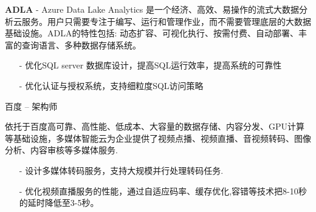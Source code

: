 \documentclass[10pt,a4paper]{moderncv}
\begin{document}
\vspace{1ex}
{
    \textbf{ADLA} - Azure Data Lake Analytics 是一个经济、高效、易操作的流式大数据分析云服务。用户只需要专注于编写、运行和管理作业，而不需要管理底层的大数据基础设施。ADLA的特性包括: 动态扩容、可视化执行、按需付费、自动部署、丰富的查询语言、多种数据存储系统。
    \begin{itemize}
		\item[-] 优化SQL server 数据库设计，提高SQL运行效率，提高系统的可靠性
		\item[-] 优化认证与授权系统，支持细粒度SQL访问策略
	\end{itemize}
}
\vspace{2ex}

\pagebreak
	{ 百度 -- 架构师}{}{}{}{}
	\vspace{1ex}

{
	 依托于百度高可靠、高性能、低成本、大容量的数据存储、内容分发、GPU计算等基础设施，多媒体智能云为企业提供了视频点播、视频直播、音视频转码、图像分析、内容审核等多媒体服务.
	 \begin{itemize}
		\item[-] 设计多媒体转码服务，支持大规模并行处理转码任务.
		\item[-] 优化视频直播服务的性能，通过自适应码率、缓存优化,容错等技术把8-10秒的延时降低至3-5秒。
	 \end{itemize}
}

\vspace{2ex}
\vspace*{0.4\baselineskip}
\end{document}

